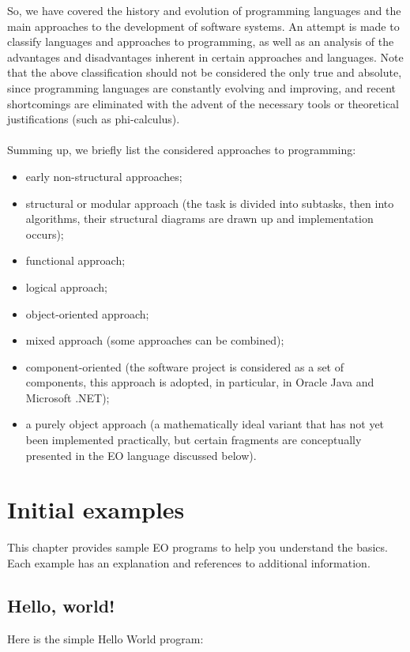 \documentclass[12pt]{book}
\begin{document}
So, we have covered the  history and evolution of programming languages  and the main approaches to the development of software systems. An attempt is made to classify languages and approaches to programming, as well as an analysis of the advantages and disadvantages inherent in certain approaches and languages. Note that the above classification should not be considered the only true and absolute, since programming languages are constantly evolving and improving, and recent shortcomings are eliminated with the advent of the necessary tools or theoretical justifications (such as phi-calculus).
\\
\\
Summing up, we briefly list the considered approaches to programming:
\begin{itemize}
    \item early non-structural approaches;
    \item structural or modular approach (the task is divided into subtasks, then into algorithms, their structural diagrams are drawn up and implementation occurs);
    \item functional  approach;
    \item logical approach;
    \item object-oriented approach;
    \item mixed approach (some approaches can be combined);
    \item component-oriented (the software project is considered as a set of components, this approach is adopted, in particular, in Oracle Java and Microsoft .NET);
    \item a purely object approach (a mathematically ideal variant that has not yet been implemented practically, but certain fragments are conceptually presented in the EO language discussed below).
\end{itemize}

\chapter{Initial examples}

This chapter provides sample EO programs to help you understand the basics. Each example has an explanation and references to additional information.

\section{Hello, world!}
Here is the simple Hello World program:
\end{document}

